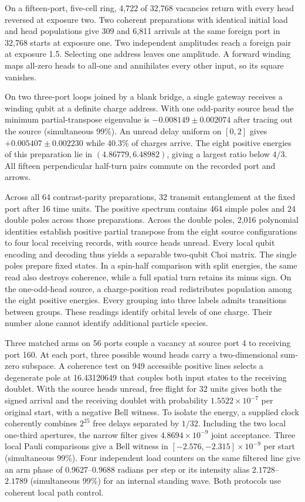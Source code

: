 On a fifteen-port, five-cell ring, 4,722 of 32,768 vacancies return
with every head reversed at exposure two. Two coherent preparations
with identical initial load and head populations give 309 and 6,811
arrivals at the same foreign port in 32,768 starts at exposure one.
Two independent amplitudes reach a foreign pair at exposure 1.5.
Selecting one address leaves one amplitude. A forward winding maps
all-zero heads to all-one and annihilates every other input, so its
square vanishes.

On two three-port loops joined by a blank bridge, a single gateway
receives a winding qubit at a definite charge address. With one
odd-parity source head the minimum partial-transpose eigenvalue is
$-0.008149\pm0.002074$ after tracing out the source (simultaneous
99\%). An unread delay uniform on $[0,2]$ gives
$+0.005407\pm0.002230$ while 40.3\% of charges arrive. The eight
positive energies of this preparation lie in $(4.86779,6.48982)$,
giving a largest ratio below $4/3$. All fifteen perpendicular
half-turn pairs commute on the recorded port and arrows.

Across all 64 contrast-parity preparations, 32 transmit entanglement
at the fixed port after 16 time units. The positive spectrum contains
464 simple poles and 24 double poles across those preparations.
Across the double poles, 2,016 polynomial identities establish
positive partial transpose from the eight source configurations to four
local receiving records, with source heads unread. Every local qubit
encoding and decoding thus yields a separable two-qubit Choi matrix.
The single poles prepare fixed states. In a spin-half comparison with split energies, the same read
also destroys coherence,
while a full spatial turn retains its minus sign. On the one-odd-head
source, a charge-position read redistributes population among the eight
positive energies. Every grouping into three labels admits transitions
between groups. These readings identify orbital levels of one charge.
Their number alone cannot identify additional particle species.

Three matched arms on 56 ports couple a vacancy at source port 4 to
receiving port 160. At each port, three possible wound heads carry a
two-dimensional sum-zero subspace. A coherence test on 949 accessible
positive lines selects a degenerate pole at 16.43120649 that couples
both input states to the receiving doublet. With the source heads unread, free
flight for 32 units gives both the signed arrival and the receiving
doublet with probability $1.5522\times10^{-7}$ per original start,
with a negative Bell witness. To isolate the energy, a supplied clock coherently combines $2^{25}$
free delays separated by $1/32$. Including the two local one-third
apertures, the narrow filter gives $4.8694\times10^{-9}$ joint
acceptance. Three local Pauli comparisons give a Bell witness in
$[-2.576,-2.315]\times10^{-9}$ per start (simultaneous 99\%).
Four independent load counters on the same filtered line give an arm
phase of $0.9627$--$0.9688$ radians per step or its intensity alias
$2.1728$--$2.1789$ (simultaneous 99\%) for an internal standing wave. Both protocols use coherent local path control.


